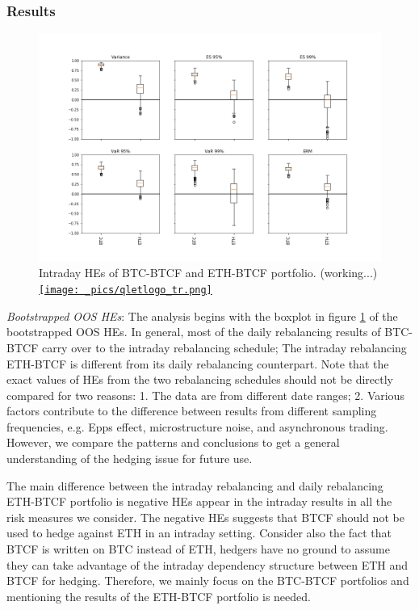 \documentclass[11pt,a4paper,english]{article}
\begin{document}
\subsubsection{Results}
\begin{figure}[t]
\includegraphics[width=\textwidth]{_pics/hourly_HE.png}
  \caption{Intraday HEs of BTC-BTCF and ETH-BTCF portfolio. (working...)
  \href{http://www.quantlet.com/}{\texttt{[image: \_pics/qletlogo\_tr.png]}} }
\label{fig:HEboxplot_intraday}
\end{figure}

\textit{Bootstrapped OOS HEs}: The analysis begins with the boxplot in figure \ref{fig:HEboxplot_intraday} of the bootstrapped OOS HEs.
In general, most of the daily rebalancing results of BTC-BTCF carry over to the intraday rebalancing schedule;
The intraday rebalancing ETH-BTCF is different from its daily rebalancing counterpart.
Note that the exact values of HEs from the two rebalancing schedules should not be directly compared for two reasons: 1. The data are from different date ranges; 2. Various factors contribute to the difference between results from different sampling frequencies, e.g. Epps effect, microstructure noise,
and asynchronous trading.
However, we compare the patterns and conclusions to get a general understanding of the hedging issue for future use.

The main difference between the intraday rebalancing and daily rebalancing ETH-BTCF portfolio is negative HEs appear in the intraday results in all the risk measures we consider.
The negative HEs suggests that BTCF should not be used to hedge against ETH in an intraday setting.
Consider also the fact that BTCF is written on BTC instead of ETH, hedgers have no ground to assume they can take advantage of the intraday dependency structure between ETH and BTCF for hedging.
Therefore, we mainly focus on the BTC-BTCF portfolios and mentioning the results of the ETH-BTCF portfolio is needed.
\end{document}
